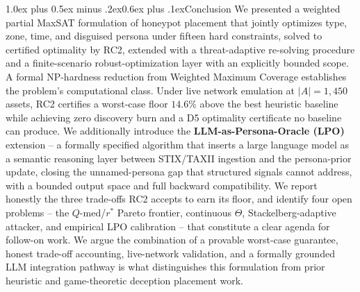 \documentclass[10pt,twocolumn]{article}
\makeatletter
\renewcommand{\section}{\@startsection{section}{1}{0pt}%
  {1.0ex plus 0.5ex minus .2ex}{0.6ex plus .1ex}{\normalfont\large\bfseries}}
\makeatother
\begin{document}
\section{Conclusion}
We presented a weighted partial MaxSAT formulation of honeypot placement that jointly optimizes type, zone, time, and disguised persona under fifteen hard constraints, solved to certified optimality by RC2, extended with a threat-adaptive re-solving procedure and a finite-scenario robust-optimization layer with an explicitly bounded scope. A formal NP-hardness reduction from Weighted Maximum Coverage establishes the problem's computational class. Under live network emulation at $|A|{=}1{,}450$ assets, RC2 certifies a worst-case floor $14.6\%$ above the best heuristic baseline while achieving zero discovery burn and a D5 optimality certificate no baseline can produce. We additionally introduce the \textbf{LLM-as-Persona-Oracle (LPO)} extension -- a formally specified algorithm that inserts a large language model as a semantic reasoning layer between STIX/TAXII ingestion and the persona-prior update, closing the unnamed-persona gap that structured signals cannot address, with a bounded output space and full backward compatibility. We report honestly the three trade-offs RC2 accepts to earn its floor, and identify four open problems -- the $Q$-med/$r^*$ Pareto frontier, continuous $\Theta$, Stackelberg-adaptive attacker, and empirical LPO calibration -- that constitute a clear agenda for follow-on work. We argue the combination of a provable worst-case guarantee, honest trade-off accounting, live-network validation, and a formally grounded LLM integration pathway is what distinguishes this formulation from prior heuristic and game-theoretic deception placement work.
\end{document}
